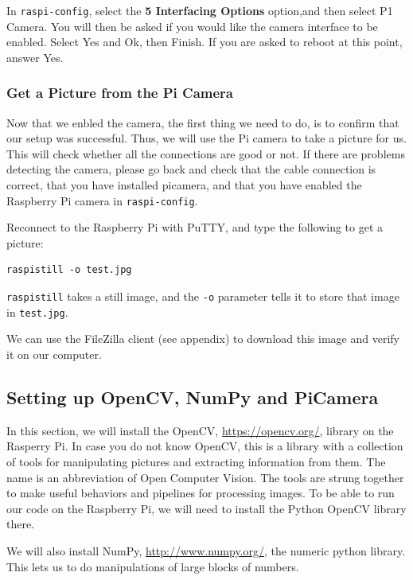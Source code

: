 In \lstinline{raspi-config}, select the \textbf{5 Interfacing Options} option,and then select P1 Camera. 
You will then be asked if you would like the camera interface to be enabled. Select Yes and Ok, then Finish. 
If you are asked to reboot at this point, answer Yes. 


\subsubsection{Get a Picture from the Pi Camera}
\label{get_a_picture}

Now that we enbled the camera, the first thing we need to do, is to confirm that our setup was successful.
Thus, we will use the Pi camera to take a picture for us. This will check whether all the connections are good or not.
If there are problems detecting the camera, please go back and check that the cable
connection is correct, that you have installed picamera, and that you have enabled the
Raspberry Pi camera in \lstinline{raspi-config}.

Reconnect to the Raspberry Pi with PuTTY, and type the following to get a picture:

\begin{lstlisting}
raspistill -o test.jpg
\end{lstlisting}

\lstinline{raspistill} takes a still image, and the \lstinline{-o} parameter tells it to store that image in
\lstinline{test.jpg}. 

We can use the FileZilla client (see appendix) to download this image and verify it on our computer. 


\subsection{Setting up OpenCV, NumPy and PiCamera}
\label{setup_opencv}

In this section, we will install the OpenCV, \url{https://opencv.org/}, library  on the Rasperry Pi. In case you do not know OpenCV, this 
is  a library with a collection of tools for manipulating pictures and extracting
information from them. The name is an abbreviation of Open Computer Vision. The tools are
strung together to make useful behaviors and pipelines for processing images. To be able to
run our code on the Raspberry Pi, we will need to install the Python OpenCV library there.

We will also install NumPy, \url{http://www.numpy.org/}, the numeric python library. This lets us to do manipulations of
large blocks of numbers. 

